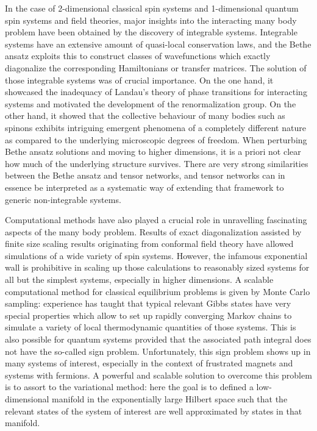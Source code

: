 \documentclass[rmp,aps,reprint,superscriptaddress,nobalancelastpage]{revtex4-1}
\begin{document}
In the case of 2-dimensional classical spin systems and 1-dimensional quantum spin systems and field theories, major insights into the interacting many body problem have been obtained by the discovery of integrable systems. Integrable systems have an extensive amount of quasi-local conservation laws, and the Bethe ansatz exploits this to construct classes of wavefunctions which exactly diagonalize the corresponding Hamiltonians or transfer matrices. The solution of those integrable systems was of crucial importance. On the one hand, it showcased the inadequacy of Landau's theory of phase transitions for interacting systems and motivated the development of the renormalization group. On the other hand, it showed that the collective behaviour of many bodies such as spinons exhibits intriguing emergent phenomena of a completely different nature as compared to the underlying microscopic degrees of freedom. When perturbing Bethe ansatz solutions and moving to higher dimensions, it is a priori not clear how much of the underlying structure survives. There are very strong similarities between the Bethe ansatz and tensor networks, and tensor networks can in essence be interpreted as a systematic way of extending that framework to generic non-integrable systems.

Computational methods have also played a crucial role in unravelling fascinating aspects of the many body problem. Results of exact diagonalization assisted by finite size scaling results originating from conformal field theory have allowed simulations of a wide variety of spin systems. However, the infamous exponential wall is prohibitive in scaling up those calculations to reasonably sized systems for all but the simplest systems, especially in higher dimensions. A scalable computational method for classical equilibrium problems is given by Monte Carlo sampling: experience has taught that typical relevant Gibbs states have very special properties which allow to set up rapidly converging Markov chains to simulate a variety of local thermodynamic quantities of those systems. This is also  possible for quantum systems provided that the associated path integral does not have the so-called sign problem. Unfortunately, this sign problem shows up in many systems of interest, especially in the context of frustrated magnets and systems with fermions. A powerful and scalable solution to overcome this problem is to assort to the variational method: here the goal is to defined a low-dimensional manifold in the exponentially large Hilbert space such that the relevant states of the system of interest are well approximated by states in that manifold.
\end{document}

